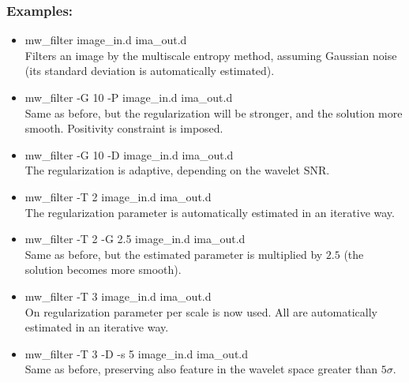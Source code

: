 \subsubsection*{Examples:}
\begin{itemize}
\baselineskip=0.4truecm
\itemsep=0.1truecm
\item mw\_filter image\_in.d ima\_out.d \\
Filters an image by the multiscale entropy method, assuming
Gaussian noise (its standard deviation is automatically estimated).
\item mw\_filter -G 10 -P image\_in.d ima\_out.d \\
Same as before, but the regularization will be stronger, and the solution
more smooth. Positivity constraint is imposed.
\item mw\_filter -G 10 -D image\_in.d ima\_out.d \\
The regularization is adaptive, depending on the wavelet SNR.
\item mw\_filter -T 2 image\_in.d ima\_out.d \\
The regularization parameter is automatically estimated in an iterative way.
\item mw\_filter -T 2 -G 2.5 image\_in.d ima\_out.d \\
Same as before, but the estimated parameter is multiplied by $2.5$ (the solution
becomes more smooth).
\item mw\_filter -T 3 image\_in.d ima\_out.d \\
On regularization parameter per scale is now used. All are automatically 
estimated in an iterative way.
\item mw\_filter -T 3 -D -s 5 image\_in.d ima\_out.d \\ 
Same as before, preserving also feature in the wavelet space greater than
$5\sigma$.
\end{itemize}


